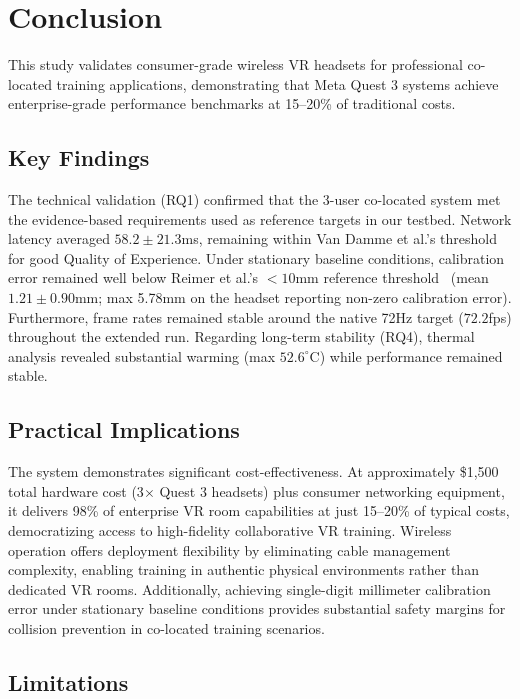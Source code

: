 \section{Conclusion}

This study validates consumer-grade wireless VR headsets for professional co-located training applications, demonstrating that Meta Quest 3 systems achieve enterprise-grade performance benchmarks at 15--20\% of traditional costs.

\subsection{Key Findings}

The technical validation (RQ1) confirmed that the 3-user co-located system met the evidence-based requirements used as reference targets in our testbed. Network latency averaged $58.2 \pm 21.3$ms, remaining within Van Damme et al.'s threshold~\cite{VanDammeSam2024Iolo} for good Quality of Experience. Under stationary baseline conditions, calibration error remained well below Reimer et al.'s $<10$mm reference threshold~\cite{ReimerDennis2021CfSV} (mean $1.21 \pm 0.90$mm; max 5.78mm on the headset reporting non-zero calibration error). Furthermore, frame rates remained stable around the native 72Hz target ($72.2$fps) throughout the extended run. Regarding long-term stability (RQ4), thermal analysis revealed substantial warming (max $52.6^{\circ}$C) while performance remained stable.

\subsection{Practical Implications}

The system demonstrates significant cost-effectiveness. At approximately \$1,500 total hardware cost (3$\times$ Quest 3 headsets) plus consumer networking equipment, it delivers 98\% of enterprise VR room capabilities at just 15--20\% of typical costs, democratizing access to high-fidelity collaborative VR training. Wireless operation offers deployment flexibility by eliminating cable management complexity, enabling training in authentic physical environments rather than dedicated VR rooms. Additionally, achieving single-digit millimeter calibration error under stationary baseline conditions provides substantial safety margins for collision prevention in co-located training scenarios.

\subsection{Limitations}

